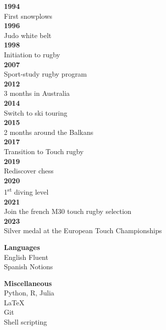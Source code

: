 \documentclass{article}
\begin{document}
\begin{minipage}{0.15\textwidth}
    \begin{minipage}{1\textwidth}
    \begin{flushleft}
        \textbf{1994} \\
        First snowplows \\[.2cm]
        \textbf{1996} \\
        Judo white belt \\[.2cm]
        \textbf{1998} \\
        Initiation to rugby \\[.9cm]
        \textbf{2007} \\
        Sport-study rugby program \\[.5cm]
        \textbf{2012} \\
        3 months in Australia \\[.2cm]
        \textbf{2014} \\
        Switch to ski touring \\[.1cm]
        \textbf{2015} \\
        2 months around the Balkans \\[.2cm]
        \textbf{2017} \\
        Transition to Touch rugby \\[.2cm]
        \textbf{2019} \\
        Rediscover chess \\[.1cm]
        \textbf{2020} \\
        1\textsuperscript{st} diving level \\[.1cm]
        \textbf{2021} \\
        Join the french M30 touch rugby selection \\[.2cm]
        \textbf{2023} \\
        Silver medal at the European Touch Championships
    \end{flushleft}
    \end{minipage}
    \begin{minipage}{1\textwidth}
    \vspace{7.1cm}
    \begin{flushleft}
        \textbf{Languages} \\[.1cm]
        English \quad Fluent \\
        Spanish \quad Notions
    \end{flushleft}
    \end{minipage}
    \begin{minipage}{1\textwidth}
    \vspace{1cm}
    \begin{flushleft}
        \textbf{Miscellaneous} \\[.1cm]
        Python, R, Julia \\
        \LaTeX \\
        Git \\
        Shell scripting
    \end{flushleft}
    \end{minipage}
\end{minipage}
\end{document}
